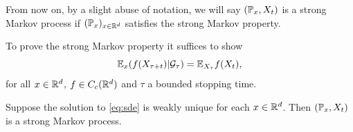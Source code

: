 From now on, by a slight abuse of notation, we will say $({\mathbb P}_x, X_t)$ is a strong Markov process if $({\mathbb P}_x)_{x\in {\mathbb R}^d}$ satisfies the strong Markov property.
    
    To prove the strong Markov property it suffices to show 
    \begin{equation}\label{eq:s-markov}
	{\mathbb E}_x(f(X_{\tau+t})|{\mathcal G}_\tau)={\mathbb E}_{X_\tau} f(X_t),
    \end{equation}
    for all $x\in {\mathbb R}^d$, $f\in C_c({\mathbb R}^d)$ and $\tau$ a bounded stopping time. 
	
\begin{theorem}\label{thm:Markov}
    Suppose the solution to \eqref{eq:sde} is weakly unique for each $x\in {\mathbb R}^d$. Then $({\mathbb P}_x, X_t)$ is a strong Markov process.
\end{theorem}
	
